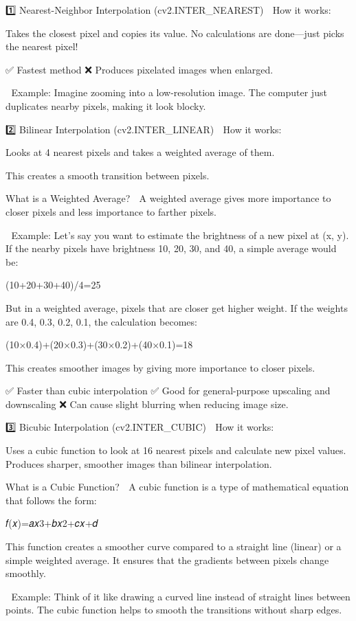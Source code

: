 1️⃣ Nearest-Neighbor Interpolation (cv2.INTER_NEAREST)
📌 How it works:

Takes the closest pixel and copies its value.
No calculations are done—just picks the nearest pixel!

✅ Fastest method
❌ Produces pixelated images when enlarged.

🔹 Example:
Imagine zooming into a low-resolution image. The computer just duplicates nearby pixels, making it look blocky.

2️⃣ Bilinear Interpolation (cv2.INTER_LINEAR)
📌 How it works:

Looks at 4 nearest pixels and takes a weighted average of them.

This creates a smooth transition between pixels.

What is a Weighted Average? 🤔
A weighted average gives more importance to closer pixels and less importance to farther pixels.

🔹 Example:
Let’s say you want to estimate the brightness of a new pixel at (x, y).
If the nearby pixels have brightness 10, 20, 30, and 40, a simple average would be:

(10+20+30+40)/4=25

But in a weighted average, pixels that are closer get higher weight.
If the weights are 0.4, 0.3, 0.2, 0.1, the calculation becomes:

(10×0.4)+(20×0.3)+(30×0.2)+(40×0.1)=18

This creates smoother images by giving more importance to closer pixels.

✅ Faster than cubic interpolation
✅ Good for general-purpose upscaling and downscaling
❌ Can cause slight blurring when reducing image size.

3️⃣ Bicubic Interpolation (cv2.INTER_CUBIC)
📌 How it works:

Uses a cubic function to look at 16 nearest pixels and calculate new pixel values.
Produces sharper, smoother images than bilinear interpolation.

What is a Cubic Function? 🤔
A cubic function is a type of mathematical equation that follows the form:

𝑓(𝑥)=𝑎𝑥3+𝑏𝑥2+𝑐𝑥+𝑑

This function creates a smoother curve compared to a straight line (linear) or a simple weighted average.
It ensures that the gradients between pixels change smoothly.

🔹 Example:
Think of it like drawing a curved line instead of straight lines between points. The cubic function helps to smooth the transitions without sharp edges.

